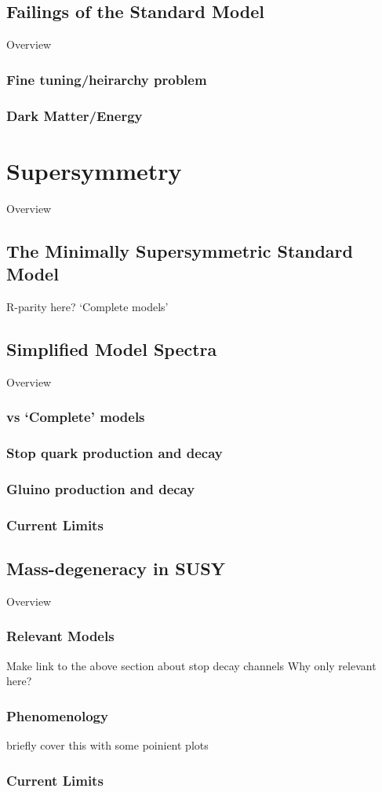 \subsection{Failings of the Standard Model}
Overview
\subsubsection{Fine tuning/heirarchy problem}
\subsubsection{Dark Matter/Energy}


\section{Supersymmetry}  %
\label{sec:theory_supersymmetry}
Overview

\subsection{The Minimally Supersymmetric Standard Model}
R-parity here?
`Complete models'

\subsection{Simplified Model Spectra}
Overview
\subsubsection{vs `Complete' models}
\subsubsection{Stop quark production and decay}
\subsubsection{Gluino production and decay}
\subsubsection{Current Limits}

\subsection{Mass-degeneracy in SUSY}
Overview
\subsubsection{Relevant Models}
Make link to the above section about stop decay channels
Why only relevant here?
\subsubsection{Phenomenology}
briefly cover this with some poinient plots
\subsubsection{Current Limits}

